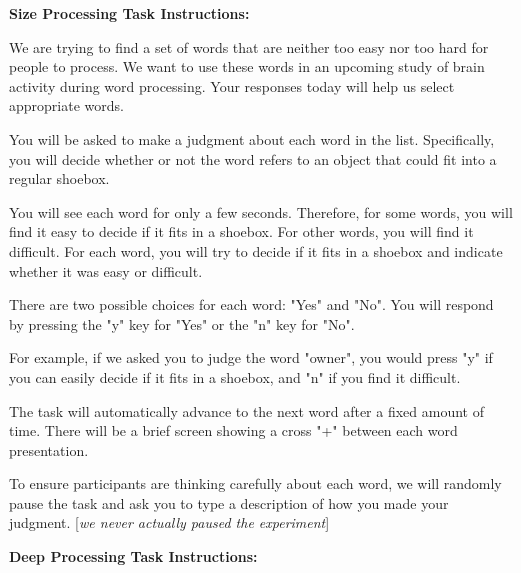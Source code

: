 \documentclass[12pt]{article}
\begin{document}
\textbf{Size Processing Task Instructions:}

\begin{displayquote}


         We are trying to find a set of words that are neither too easy nor too hard for people to process. We want to use these words in an upcoming study of brain activity during word processing. Your responses today will help us select appropriate words.

       You will be asked to make a judgment about each word in the list.
       Specifically, you will decide whether or not the word refers to an object that could
       fit into a regular shoebox.

       You will see each word for only a few seconds. Therefore, for some words, you will find it easy to decide if it fits in a shoebox. For other words, you will find it difficult. For each word, you will try to decide if it fits in a shoebox and indicate whether it was easy or difficult. 

      There are two possible choices for each word: "Yes" and "No". You will respond by pressing
      the "y" key for "Yes" or the "n" key for "No".

      For example, if we asked you to judge the word "owner", you would press "y" if you can easily decide if it fits in a shoebox, and "n" if you find it difficult.

      The task will automatically advance to the next word after a fixed amount of time.
      There will be a brief screen showing a cross "+" between each word presentation.

      To ensure participants are thinking carefully about each word, we will randomly pause the task and ask you to type a description of how you made your judgment. [\emph{we never actually paused the experiment}]

\end{displayquote}






\textbf{Deep Processing Task Instructions:}
\end{document}
